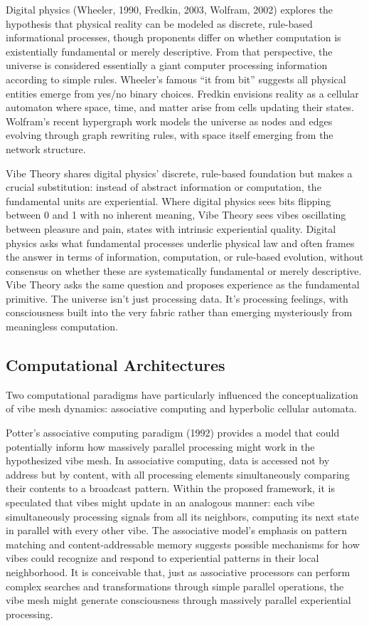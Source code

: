Digital physics (Wheeler, 1990, Fredkin, 2003, Wolfram, 2002) explores the hypothesis that physical reality can be modeled as discrete, rule-based informational processes, though proponents differ on whether computation is existentially fundamental or merely descriptive. From that perspective, the universe is considered essentially a giant computer processing information according to simple rules. Wheeler's famous ``it from bit'' suggests all physical entities emerge from yes/no binary choices. Fredkin envisions reality as a cellular automaton where space, time, and matter arise from cells updating their states. Wolfram's recent hypergraph work models the universe as nodes and edges evolving through graph rewriting rules, with space itself emerging from the network structure.

Vibe Theory shares digital physics' discrete, rule-based foundation but makes a crucial substitution: instead of abstract information or computation, the fundamental units are experiential. Where digital physics sees bits flipping between 0 and 1 with no inherent meaning, Vibe Theory sees vibes oscillating between pleasure and pain, states with intrinsic experiential quality. Digital physics asks what fundamental processes underlie physical law and often frames the answer in terms of information, computation, or rule-based evolution, without consensus on whether these are systematically fundamental or merely descriptive. Vibe Theory asks the same question and proposes experience as the fundamental primitive. The universe isn't just processing data. It's processing feelings, with consciousness built into the very fabric rather than emerging mysteriously from meaningless computation.

\subsection{Computational Architectures}

Two computational paradigms have particularly influenced the conceptualization of vibe mesh dynamics: associative computing and hyperbolic cellular automata.

Potter's associative computing paradigm (1992) provides a model that could potentially inform how massively parallel processing might work in the hypothesized vibe mesh. In associative computing, data is accessed not by address but by content, with all processing elements simultaneously comparing their contents to a broadcast pattern. Within the proposed framework, it is speculated that vibes might update in an analogous manner: each vibe simultaneously processing signals from all its neighbors, computing its next state in parallel with every other vibe. The associative model's emphasis on pattern matching and content-addressable memory suggests possible mechanisms for how vibes could recognize and respond to experiential patterns in their local neighborhood. It is conceivable that, just as associative processors can perform complex searches and transformations through simple parallel operations, the vibe mesh might generate consciousness through massively parallel experiential processing.

